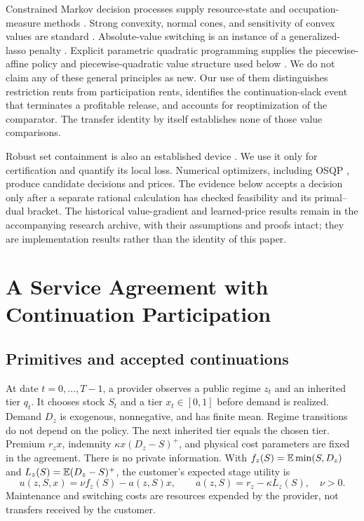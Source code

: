 \documentclass[11pt,letterpaper]{article}
\theoremstyle{definition}\newtheorem{assumption}[theorem]{Assumption}
\begin{document}
Constrained Markov decision processes supply resource-state and occupation-measure methods \citep{Altman1999}. Strong convexity, normal cones, and sensitivity of convex values are standard \citep{BoydVandenberghe2004}. Absolute-value switching is an instance of a generalized-lasso penalty \citep{TibshiraniTaylor2011}. Explicit parametric quadratic programming supplies the piecewise-affine policy and piecewise-quadratic value structure used below \citep{Bemporad2002}. We do not claim any of these general principles as new. Our use of them distinguishes restriction rents from participation rents, identifies the continuation-slack event that terminates a profitable release, and accounts for reoptimization of the comparator. The transfer identity by itself establishes none of those value comparisons.

Robust set containment is also an established device \citep{BenTalNemirovski2000,BertsimasSim2004}. We use it only for certification and quantify its local loss. Numerical optimizers, including OSQP \citep{Stellato2020}, produce candidate decisions and prices. The evidence below accepts a decision only after a separate rational calculation has checked feasibility and its primal--dual bracket. The historical value-gradient and learned-price results remain in the accompanying research archive, with their assumptions and proofs intact; they are implementation results rather than the identity of this paper.

\section{A Service Agreement with Continuation Participation}\label{sec:model}
\subsection{Primitives and accepted continuations}
At date $t=0,\ldots,T-1$, a provider observes a public regime $z_t$ and an inherited tier $q_t$. It chooses stock $S_t$ and a tier $x_t\in[0,1]$ before demand is realized. Demand $D_z$ is exogenous, nonnegative, and has finite mean. Regime transitions do not depend on the policy. The next inherited tier equals the chosen tier. Premium $r_zx$, indemnity $\kappa x(D_z-S)^+$, and physical cost parameters are fixed in the agreement. There is no private information. With $f_z(S)=\mathbb E\min(S,D_z)$ and $L_z(S)=\mathbb E(D_z-S)^+$, the customer's expected stage utility is
\begin{equation}\label{eq:customer}
 u(z,S,x)=\nu f_z(S)-a(z,S)x,\qquad a(z,S)=r_z-\kappa L_z(S),\quad \nu>0.
\end{equation}
Maintenance and switching costs are resources expended by the provider, not transfers received by the customer.
\end{document}
